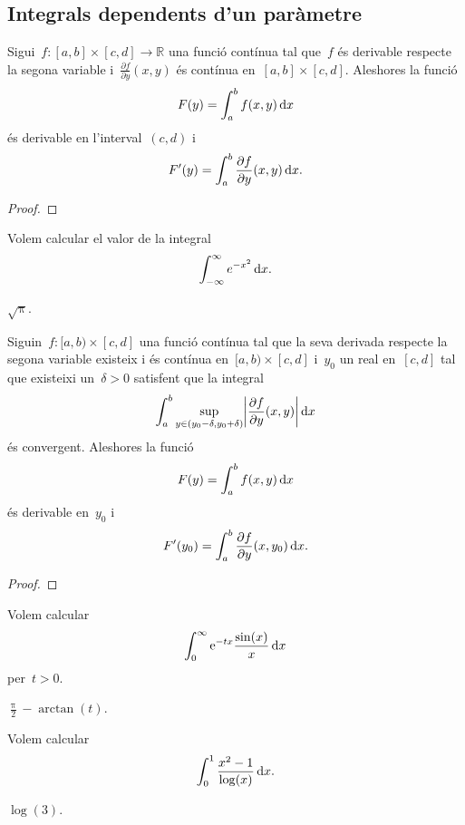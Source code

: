 \documentclass[../../main.tex]{subfiles}
\begin{document}
	\subsection{Integrals dependents d'un paràmetre}
	\begin{theorem}
		\label{thm:criteri per la derivació sota el signe de la integral}
		Sigui~\(f\colon[a,b]\times[c,d]\longrightarrow\mathbb{R}\) una funció contínua tal que~\(f\) és derivable respecte la segona variable i~\(\frac{\partial f}{\partial y}(x,y)\) és contínua en~\([a,b]\times[c,d]\).
		Aleshores la funció
		\[
		    F(y)=\int_{a}^{b}f(x,y)\mathop{}\!\mathrm{d} x
		\]
		és derivable en l'interval~\((c,d)\) i
		\[
		    F'(y)=\int_{a}^{b}\frac{\partial f}{\partial y}(x,y)\mathop{}\!\mathrm{d} x.
		\]
		\begin{proof}
		\end{proof}
	\end{theorem}
	\begin{example}
		\label{ex:integral de Gauss}
		Volem calcular el valor de la integral
		\[
		    \int_{-\infty}^{\infty}e^{-x^{2}}\mathop{}\!\mathrm{d} x.
		\] %
		\begin{solution}
			\(\sqrt{\uppi}\).
		\end{solution}
	\end{example}
	\begin{theorem}
		\label{thm:criteri per la derivabilitat sota el signe de la integral}
		Siguin~\(f\colon[a,b)\times[c,d]\) una funció contínua tal que la seva derivada respecte la segona variable existeix i és contínua en~\([a,b)\times[c,d]\) i~\(y_{0}\) un real en~\([c,d]\) tal que existeixi un~\(\delta>0\) satisfent que la integral
		\[
		    \int_{a}^{b}\sup_{y\in(y_{0}-\delta,y_{0}+\delta)}\abs{\frac{\partial f}{\partial y}(x,y)}\diff x
		\]
		és convergent.
		Aleshores la funció
		\[
		    F(y)=\int_{a}^{b}f(x,y)\mathop{}\!\mathrm{d} x
		\]
		és derivable en~\(y_{0}\) i
		\[
		    F'(y_{0})=\int_{a}^{b}\frac{\partial f}{\partial y}(x,y_{0})\mathop{}\!\mathrm{d} x.
		\]
		\begin{proof}
		\end{proof}
	\end{theorem}
	\begin{example}
		\label{ex:trobar una funció derivant sota el signe de la integral}
		Volem calcular
		\[
		    \int_{0}^{\infty}\mathrm{e}^{-tx}\frac{\sin(x)}{x}\mathop{}\!\mathrm{d} x
		\]
		per~\(t>0\).
		\begin{solution}
			\(\frac{\uppi}{2}-\arctan(t)\).
		\end{solution}
	\end{example}
	\begin{example}
		\label{ex:trobar un valor derivant sota el signe de la integral inventant-se una funció}
		Volem calcular
		\[
		    \int_{0}^{1}\frac{x^{2}-1}{\log(x)}\mathop{}\!\mathrm{d} x.
		\]
		\begin{solution}
			\(\log(3)\).
		\end{solution}
	\end{example}
\end{document}
